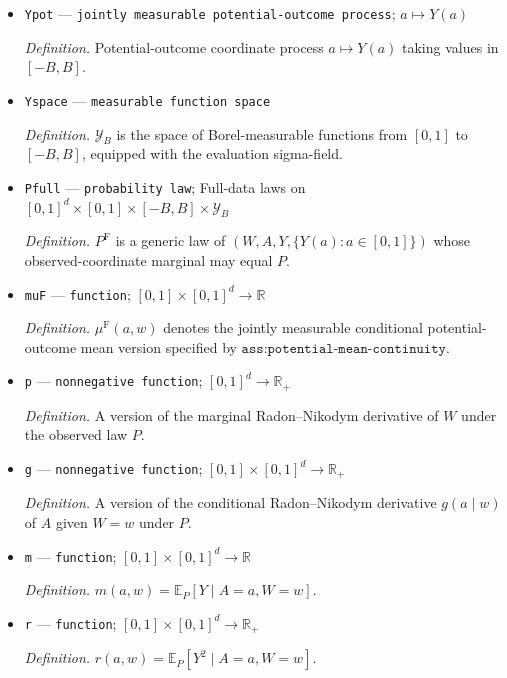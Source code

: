 \documentclass{article}
\begin{document}
\begin{itemize}
  \par\smallskip\noindent\emph{Definition.} Observed outcome, the third coordinate of \(O\).
  \item \texttt{Ypot} --- \texttt{jointly measurable potential-\allowbreak{}outcome process}; \(a\mapsto Y(a)\)
  \par\smallskip\noindent\emph{Definition.} Potential-outcome coordinate process \(a\mapsto Y(a)\) taking values in \([-B,B]\).
  \item \texttt{Yspace} --- \texttt{measurable function space}
  \par\smallskip\noindent\emph{Definition.} \(\mathcal Y_B\) is the space of Borel-measurable functions from \([0,1]\) to \([-B,B]\), equipped with the evaluation sigma-field.
  \item \texttt{Pfull} --- \texttt{probability law}; Full-data laws on \([0,1]^d\times[0,1]\times[-B,B]\times\mathcal Y_B\)
  \par\smallskip\noindent\emph{Definition.} \(P^{\mathrm F}\) is a generic law of \((W,A,Y,\{Y(a):a\in[0,1]\})\) whose observed-coordinate marginal may equal \(P\).
  \item \texttt{muF} --- \texttt{function}; \([0,1]\times[0,1]^{d}\to\mathbb R\)
  \par\smallskip\noindent\emph{Definition.} \(\mu^{\mathrm F}(a,w)\) denotes the jointly measurable conditional potential-outcome mean version specified by \(\texttt{ass:potential-mean-continuity}\).
  \item \texttt{p} --- \texttt{nonnegative function}; \([0,1]^{d}\to\mathbb R_{+}\)
  \par\smallskip\noindent\emph{Definition.} A version of the marginal Radon--Nikodym derivative of \(W\) under the observed law \(P\).
  \item \texttt{g} --- \texttt{nonnegative function}; \([0,1]\times[0,1]^{d}\to\mathbb R_{+}\)
  \par\smallskip\noindent\emph{Definition.} A version of the conditional Radon--Nikodym derivative \(g(a\mid w)\) of \(A\) given \(W=w\) under \(P\).
  \item \texttt{m} --- \texttt{function}; \([0,1]\times[0,1]^{d}\to\mathbb R\)
  \par\smallskip\noindent\emph{Definition.} \(m(a,w)=\mathbb E_{P}[Y\mid A=a,W=w]\).
  \item \texttt{r} --- \texttt{function}; \([0,1]\times[0,1]^{d}\to\mathbb R_{+}\)
  \par\smallskip\noindent\emph{Definition.} \(r(a,w)=\mathbb E_{P}[Y^{2}\mid A=a,W=w]\).

\end{itemize}
\end{document}
